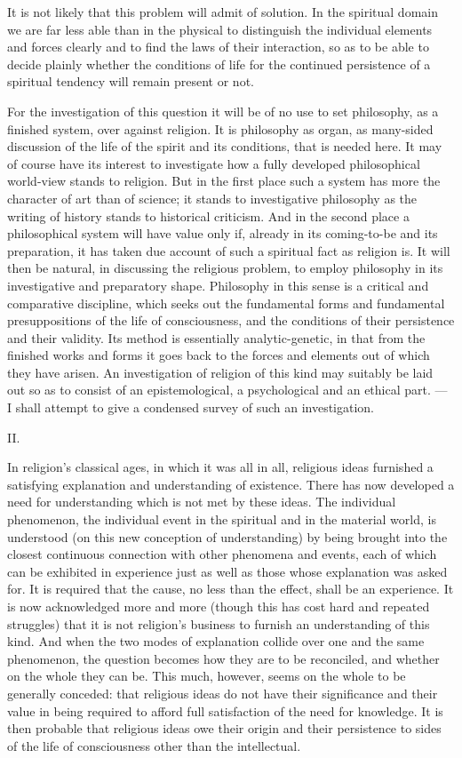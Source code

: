 \documentclass[12pt,a4paper]{article}
\newcommand{\snum}[1]{\bigskip\begin{center}#1\end{center}\nopagebreak\medskip}
\newcommand{\opage}[1]{\marginnote{\footnotesize\textit{[#1]}}}
\begin{document}
It is not likely that this problem will admit of solution. In the spiritual
domain we are far less able than in the physical to distinguish the individual
elements and forces clearly and to find the laws of their interaction, so as to
be able to decide plainly whether the conditions of life for the continued
persistence of a spiritual tendency will remain present or not.

For the investigation of this question it will be of no use to set philosophy,
as a finished system, over against religion. It is philosophy as organ, as
many-sided discussion of the life of the spirit and its conditions, that is
needed here. It may of course have its interest to investigate how a fully
developed philosophical world-view stands to religion. But in the first place
such a system has more the character of art than of science; it stands to
investigative philosophy as the writing of history stands to historical
criticism. And in the second place a philosophical system will have value only
if, already in its coming-to-be and its preparation, it has taken due account
of such a spiritual fact as religion is.
\opage{414}It will then be natural, in discussing the religious problem, to employ
philosophy in its investigative and preparatory shape. Philosophy in this sense
is a critical and comparative discipline, which seeks out the fundamental forms
and fundamental presuppositions of the life of consciousness, and the
conditions of their persistence and their validity. Its method is essentially
analytic-genetic, in that from the finished works and forms it goes back to the
forces and elements out of which they have arisen. An investigation of religion
of this kind may suitably be laid out so as to consist of an epistemological, a
psychological and an ethical part. --- I shall attempt to give a condensed
survey of such an investigation.

\snum{II.}

In religion's classical ages, in which it was all in all, religious ideas
furnished a satisfying explanation and understanding of existence. There has
now developed a need for understanding which is not met by these ideas. The
individual phenomenon, the individual event in the spiritual and in the
material world, is understood (on this new conception of understanding) by
being brought into the closest continuous connection with other phenomena and
events, each of which can be exhibited in experience just as well as those
whose explanation was asked for. It is required that the cause, no less than
the effect, shall be an experience. It is now acknowledged more and more
(though this has cost hard and repeated struggles) that it is not religion's
business to furnish an understanding of this kind. And when the two modes of
explanation collide over one and the same phenomenon, the question becomes how
they are to be reconciled, and whether on the whole they can be. This much,
however, seems on the whole to be generally conceded: that religious ideas do
not have their significance and their value in being required to afford full
satisfaction of the need for knowledge. It
\opage{415}is then probable that religious ideas owe their origin and their persistence to
sides of the life of consciousness other than the intellectual.
\end{document}
